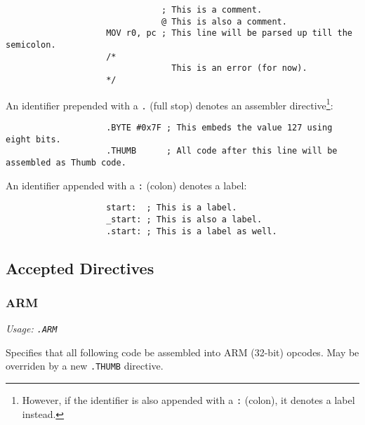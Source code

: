 \documentclass[a4paper]{article}
\begin{document}
		\begin{center}
			\begin{varwidth}{\linewidth}
				\begin{verbatim}
					           ; This is a comment.
					           @ This is also a comment.
					MOV r0, pc ; This line will be parsed up till the semicolon.
					/*
					             This is an error (for now).
					*/
				\end{verbatim}
			\end{varwidth}
		\end{center}

		An identifier prepended with a \texttt{.} (full stop) denotes an assembler directive\footnote{However, if the identifier is also appended with a \texttt{:} (colon), it denotes a label instead.}:

		\begin{center}
			\begin{varwidth}{\linewidth}
				\begin{verbatim}
					.BYTE #0x7F ; This embeds the value 127 using eight bits.
					.THUMB      ; All code after this line will be assembled as Thumb code.
				\end{verbatim}
			\end{varwidth}
		\end{center}

		An identifier appended with a \texttt{:} (colon) denotes a label:

		\begin{center}
			\begin{varwidth}{\linewidth}
				\begin{verbatim}
					start:  ; This is a label.
					_start: ; This is also a label.
					.start: ; This is a label as well.
				\end{verbatim}
			\end{varwidth}
		\end{center}

		\subsection{Accepted Directives}
			\subsubsection{ARM}
				\textit{Usage: \texttt{.ARM}}

				Specifies that all following code be assembled into ARM (32-bit) opcodes. May be overriden by a new \texttt{.THUMB} directive.
\end{document}
